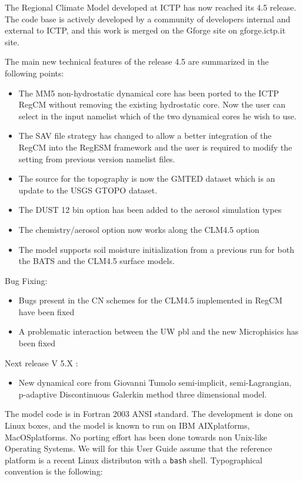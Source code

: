%
%

The Regional Climate Model developed at ICTP has now reached its 4.5 release.
The code base is actively developed by a community of developers internal and
external to ICTP, and this work is merged on the
Gforge site on gforge.ictp.it site.

The main new technical features of the release 4.5 are summarized in the
following points:

\begin{itemize}
  \item The MM5 non-hydrostatic dynamical core has been ported to the ICTP
	  RegCM without removing the existing hydrostatic core. Now the user
	  can select in the input namelist which of the two dynamical cores
	  he wish to use.
  \item The SAV file strategy has changed to allow a better integration of
	  the RegCM into the RegESM framework and the user is required to
	  modify the setting from previous version namelist files.
  \item The source for the topography is now the GMTED dataset which is an
	  update to the USGS GTOPO dataset.
  \item The DUST 12 bin option has been added to the aerosol simulation types
  \item The chemistry/aerosol option now works along the CLM4.5 option
  \item The model supports soil moisture initialization from a previous run
	  for both the BATS and the CLM4.5 surface models.
\end{itemize}
Bug Fixing:
\begin{itemize}
  \item Bugs present in the CN schemes for the CLM4.5 implemented in RegCM
	  have been fixed
  \item A problematic interaction between the UW pbl and the new Microphisics
	  has been fixed
\end{itemize}

Next release V 5.X :

\begin{itemize}
  \item New dynamical core from Giovanni Tumolo semi-implicit, semi-Lagrangian,
   p-adaptive Discontinuous Galerkin method three dimensional model.
\end{itemize}

The model code is in Fortran 2003 ANSI standard.
The development is done on Linux boxes, and the model is known to run
on IBM AIX\texttrademark platforms, MacOS\texttrademark platforms.
No porting effort has been done towards non Unix-like Operating Systems.
We will for this User Guide assume that the reference platform is a recent
Linux distributon with a \verb=bash= shell.
Typographical convention is the following:

